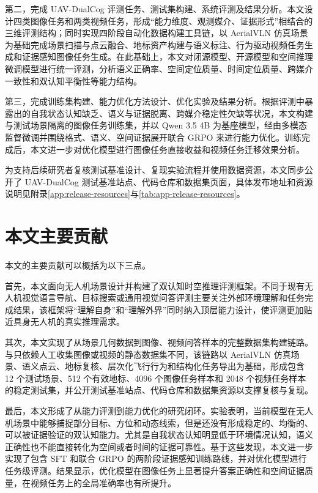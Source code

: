 第二，完成 UAV-DualCog 评测任务、测试集构建、系统评测及结果分析。本文设计四类图像任务和两类视频任务，形成“能力维度、观测媒介、证据形式”相结合的三维评测结构；同时实现四阶段自动化数据构建工具链，以 AerialVLN 仿真场景为基础完成场景扫描与点云融合、地标资产构建与语义标注、行为驱动视频任务生成和证据感知图像任务生成。在此基础上，本文对闭源模型、开源模型和空间推理微调模型进行统一评测，分析语义正确率、空间定位质量、时间定位质量、跨媒介一致性和双认知平衡性等能力结构。

第三，完成训练集构建、能力优化方法设计、优化实验及结果分析。根据评测中暴露出的自我状态认知缺乏、语义与证据脱离、跨媒介稳定性欠缺等状况，本文构建与测试场景隔离的图像任务训练集，并以 Qwen 3.5 4B 为基座模型，经由多模态监督微调并围绕格式、语义、空间证据展开联合 GRPO 来进行能力优化。训练完成后，本文进一步对优化模型进行图像任务直接收益和视频任务迁移效果分析。

为支持后续研究者复核测试基准设计、复现实验流程并使用数据资源，本文同步公开了 UAV-DualCog 测试基准站点、代码仓库和数据集页面，具体发布地址和资源说明见附录\autoref{app:release-resources}与\autoref{tab:app-release-resources}。

\section{本文主要贡献}

本文的主要贡献可以概括为以下三点。

首先，本文面向无人机场景设计并构建了双认知时空推理评测框架。不同于现有无人机视觉语言导航、目标搜索或通用视觉问答评测主要关注外部环境理解和任务完成结果，该框架将“理解自身”和“理解外界”同时纳入顶层能力设计，使评测更加贴近具身无人机的真实推理需求。

其次，本文实现了从场景几何数据到图像、视频问答样本的完整数据集构建链路。与只依赖人工收集图像或视频的静态数据集不同，该链路以 AerialVLN 仿真场景、语义点云、地标复核、层次化飞行行为和结构化任务导出为基础，形成包含 12 个测试场景、512 个有效地标、4096 个图像任务样本和 2048 个视频任务样本的稳定测试集，并公开测试基准站点、代码仓库和数据集资源以支撑复核与复现。

最后，本文形成了从能力评测到能力优化的研究闭环。实验表明，当前模型在无人机场景中能够捕捉部分目标、方位和动态线索，但是还没有形成稳定的、均衡的、可以被证据验证的双认知能力。尤其是自我状态认知明显低于环境情况认知，语义正确性也不能直接转化为空间或者时间的证据可靠性。基于这些发现，本文进一步实现了包含 SFT 和联合 GRPO 的两阶段证据感知训练路线，并对优化模型进行任务级评测。结果显示，优化模型在图像任务上显著提升答案正确性和空间证据质量，在视频任务上的全局准确率也有所提升。


